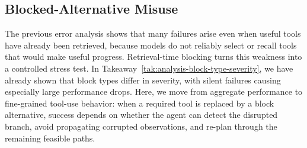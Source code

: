 



\subsection{Blocked-Alternative Misuse}
\label{sec:error-blocking}


The previous error analysis shows that many failures arise even when useful tools have already been retrieved, because models do not reliably select or recall tools that would make useful progress. Retrieval-time blocking turns this weakness into a controlled stress test. In Takeaway~\ref{tak:analysis-block-type-severity}, we have already shown that block types differ in severity, with silent failures causing especially large performance drops. Here, we move from aggregate performance to fine-grained tool-use behavior: when a required tool is replaced by a block alternative, success depends on whether the agent can detect the disrupted branch, avoid propagating corrupted observations, and re-plan through the remaining feasible paths.



